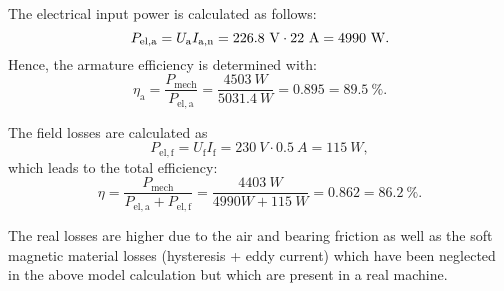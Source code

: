 \begin{solutionblock}
    The electrical input power is calculated as follows:
    \begin{equation}
        P_{\mathrm{el,a}} = \Ua I_{\mathrm{a,n}}
        = 226.8 \ \si{V} \cdot 22 \ \si{A}
        = 4990 \ \si{W}.
    \end{equation}
    Hence, the armature efficiency is determined with:
    \begin{equation}
        \eta_{\mathrm{a}} = \frac{P_{\mathrm{mech}}}{P_{\mathrm{el,a}}}
        = \frac{4503 \ \si{W}}{5031.4 \ \si{W}}
        = 0.895
        = 89.5 \ \%.
    \end{equation}

    The field losses are calculated as
    \begin{equation}
        P_{\mathrm{el,f}} = U_{\mathrm{f}} I_{\mathrm{f}}
        = 230 \ \si{V} \cdot 0.5 \ \si{A}
        = 115 \ \si{W},
    \end{equation}
    which leads to the total efficiency:
    \begin{equation}
        \eta = \frac{P_{\mathrm{mech}}}{P_{\mathrm{el,a}}+P_{\mathrm{el,f}}}
        = \frac{4403 \ \si{W}}{4990 \si{W} + 115 \ \si{W}}
        = 0.862
        = 86.2 \ \%.
    \end{equation}

    The real losses are higher due to the air and bearing friction as well as the soft magnetic material losses (hysteresis + eddy current) which have been neglected in the above model calculation but which are present in a real machine.
\end{solutionblock}





